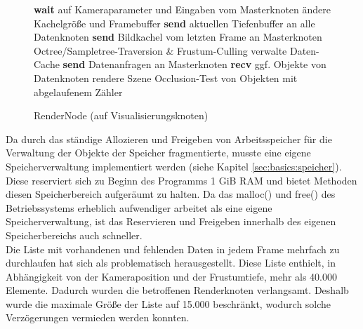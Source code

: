\begin{figure}[ttt!]
\centering
 \begin{minipage}[t]{13cm}
\begin{algorithm}[H]
  \caption{RenderNode (auf Visualisierungsknoten)\label{alg:impl:rendernode}} 
    \begin{algorithmic} [1]
	\STATE \textbf{wait} auf Kameraparameter und Eingaben vom Masterknoten
	  \STATE ändere Kachelgröße und Framebuffer
	  \STATE \textbf{send} aktuellen Tiefenbuffer an alle Datenknoten
	\ENDIF
	\STATE \textbf{send} Bildkachel vom letzten Frame an Masterknoten
	\STATE Octree/Sampletree-Traversion \& Frustum-Culling
	\STATE verwalte Daten-Cache
	\STATE \textbf{send} Datenanfragen an Masterknoten
	\STATE \textbf{recv} ggf. Objekte von Datenknoten
	\STATE rendere Szene
	\STATE Occlusion-Test von Objekten mit abgelaufenem Zähler
      \ENDWHILE
    \end{algorithmic}
\end{algorithm}
 \end{minipage}
\end{figure}
Da durch das ständige Allozieren und Freigeben von Arbeitsspeicher für die Verwaltung der Objekte der Speicher fragmentierte, musste eine eigene Speicherverwaltung implementiert werden (siehe Kapitel \ref{sec:basics:speicher}). Diese reserviert sich zu Beginn des Programms 1 GiB RAM und bietet Methoden diesen Speicherbereich aufgeräumt zu halten. Da das malloc() und free() des Betriebssystems erheblich aufwendiger arbeitet als eine eigene Speicherverwaltung, ist das Reservieren und Freigeben innerhalb des eigenen Speicherbereichs auch schneller.\\
Die Liste mit vorhandenen und fehlenden Daten in jedem Frame mehrfach zu durchlaufen hat sich als problematisch herausgestellt. Diese Liste enthielt, in Abhängigkeit von der Kameraposition und der Frustumtiefe, mehr als 40.000 Elemente. Dadurch wurden die betroffenen Renderknoten verlangsamt. Deshalb wurde die maximale Größe der Liste auf 15.000 beschränkt, wodurch solche Verzögerungen vermieden werden konnten.

